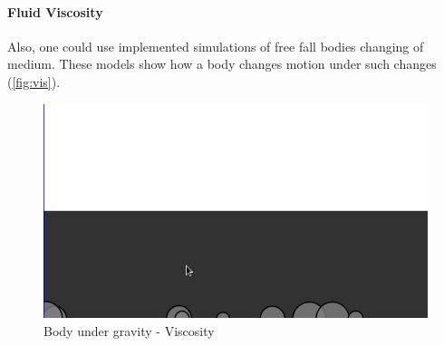 \documentclass[
12pt,				%
openright,			%
oneside,			%
a4paper,			%
brazil,				%
english,			%
]{abntex2}
\begin{document}
\paragraph{Fluid Viscosity}
Also, one could use implemented simulations of free fall bodies
changing of medium. These models show how a body changes motion
under such changes (\autoref{fig:vis}). 

\begin{figure}[ht]
  \centering
    \caption{\label{fig:vis} Body under gravity - Viscosity}
  \includegraphics[width=0.7\linewidth]{Imagens/CA/fv-is.png}
\end{figure}




\end{document}
